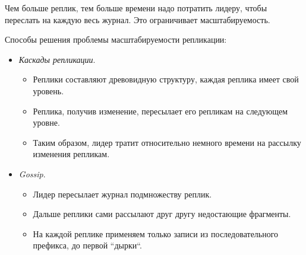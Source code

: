 \begin{remark}
    Чем больше реплик, тем больше времени надо потратить лидеру, чтобы переслать на каждую весь журнал. Это ограничивает масштабируемость.
\end{remark}

Способы решения проблемы масштабируемости репликации:
\begin{itemize}
    \item \textit{Каскады репликации}.
    \begin{itemize}
        \item Реплики составляют древовидную структуру, каждая реплика имеет свой уровень.
        \item Реплика, получив изменение, пересылает его репликам на следующем уровне.
        \item Таким образом, лидер тратит относительно немного времени на рассылку изменения репликам.
    \end{itemize}

    \item \textit{Gossip}.
    \begin{itemize}
        \item Лидер пересылает журнал подмножеству реплик.
        \item Дальше реплики сами рассылают друг другу недостающие фрагменты.
        \item На каждой реплике применяем только записи из последовательного префикса, до первой ``дырки``.
    \end{itemize}
\end{itemize}

